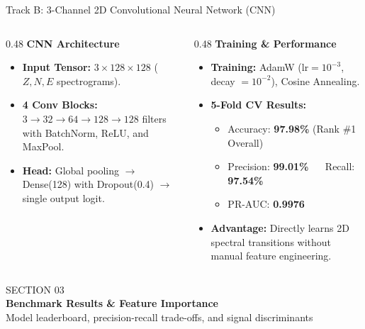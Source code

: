 \documentclass[aspectratio=169,11pt]{beamer}
\begin{document}
\begin{frame}{Track B: 3-Channel 2D Convolutional Neural Network (CNN)}
  \vspace*{0.12cm}
  \begin{columns}[T,onlytextwidth]
    \begin{column}{0.48\textwidth}
      \textbf{\small\color{tealaccent} CNN Architecture}
      \vspace*{0.08cm}
      \begin{itemize}\setlength{\itemsep}{0.25em}\footnotesize
        \item \textbf{Input Tensor:} $3 \times 128 \times 128$ ($Z, N, E$ spectrograms).
        \item \textbf{4 Conv Blocks:} $3 \to 32 \to 64 \to 128 \to 128$ filters with BatchNorm, ReLU, and MaxPool.
        \item \textbf{Head:} Global pooling $\to$ Dense(128) with Dropout(0.4) $\to$ single output logit.
      \end{itemize}
    \end{column}
    \hfill
    \begin{column}{0.48\textwidth}
      \textbf{\small\color{blastred} Training \& Performance}
      \vspace*{0.08cm}
      \begin{itemize}\setlength{\itemsep}{0.25em}\footnotesize
        \item \textbf{Training:} AdamW ($\text{lr} = 10^{-3}$, decay $= 10^{-2}$), Cosine Annealing.
        \item \textbf{5-Fold CV Results:}
          \begin{itemize}\scriptsize
            \item Accuracy: \textbf{\color{blastred} 97.98\%} (Rank \#1 Overall)
            \item Precision: \textbf{\color{blastred} 99.01\%} $\quad$ Recall: \textbf{97.54\%}
            \item PR-AUC: \textbf{\color{blastred} 0.9976}
          \end{itemize}
        \item \textbf{Advantage:} Directly learns 2D spectral transitions without manual feature engineering.
      \end{itemize}
    \end{column}
  \end{columns}
\end{frame}

{
\begin{frame}[plain]
  \vspace*{1.25cm}
  {\fontsize{13}{16}\selectfont \color{tealaccent} SECTION 03}\\[0.4em]
  {\fontsize{24}{28}\selectfont \textbf{\color{white} Benchmark Results \& Feature Importance}}\\[0.8em]
  {\fontsize{12}{15}\selectfont \color{slate} Model leaderboard, precision-recall trade-offs, and signal discriminants}
\end{frame}
}
\end{document}
